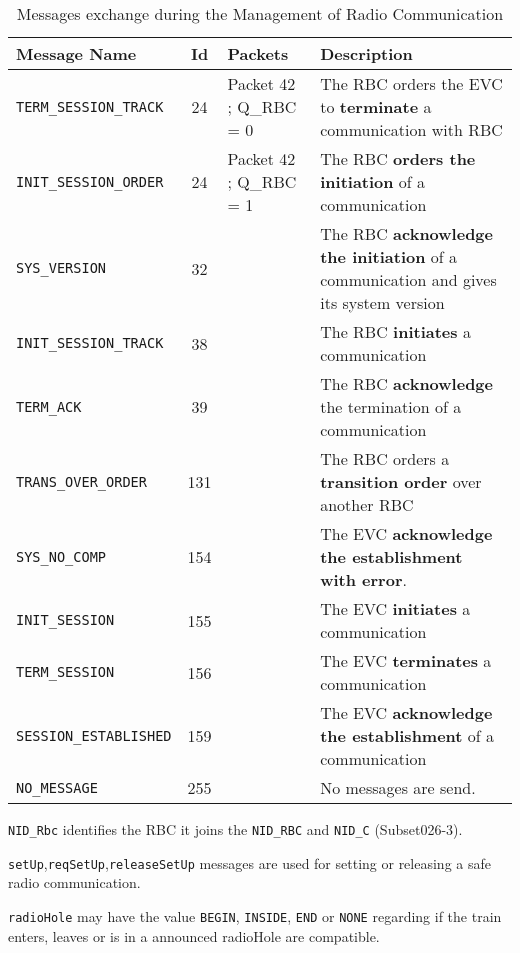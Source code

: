 \begin{table}
  \caption{\label{table:Messages} Messages exchange during the Management of
  Radio Communication}
  \begin{tabular}{lclp{}}\toprule
  Message Name & Id & Packets& Description \\\midrule
  \verb+TERM_SESSION_TRACK+& 24 & Packet 42 ; Q\_RBC = 0& The RBC orders the EVC to {\bf terminate} a communication with RBC \\
   \verb+INIT_SESSION_ORDER+ & 24 &Packet 42 ; Q\_RBC = 1 & 
   The RBC {\bf orders the initiation} of a communication \\
  \verb+SYS_VERSION+ & 32 & & The RBC {\bf acknowledge the initiation} of a
  communication and gives its system version \\
  \verb+INIT_SESSION_TRACK+ & 38 & &  The RBC {\bf initiates} a communication \\
  \verb+TERM_ACK+ & 39 & &  The RBC {\bf acknowledge} the termination of a communication \\
  \verb+TRANS_OVER_ORDER+ & 131 & & The RBC orders a {\bf transition order} over another RBC \\
  \verb+SYS_NO_COMP+ & 154 &&The EVC {\bf acknowledge the establishment with error}. \\
  \verb+INIT_SESSION+& 155 &&  The EVC {\bf initiates} a communication \\
  \verb+TERM_SESSION+ & 156&&The EVC {\bf terminates} a communication  \\
  \verb+SESSION_ESTABLISHED+ & 159 & & The EVC {\bf acknowledge the establishment} of a communication \\
  \verb+NO_MESSAGE+ & 255 & & No messages are send. \\
  \bottomrule
  \end{tabular}
\end{table}
\begin{description}
\item \verb+NID_Rbc+ identifies the RBC it joins the \verb+NID_RBC+ and
\verb+NID_C+ (Subset026-3).
\item \verb+setUp+,\verb+reqSetUp+,\verb+releaseSetUp+ messages are used for setting
or releasing a safe radio communication.
\item \verb+radioHole+ may have the value \verb+BEGIN+, \verb+INSIDE+,
\verb+END+ or
\verb+NONE+ regarding if the train enters, leaves or is in a announced radioHole 
are compatible.
\end{description}

